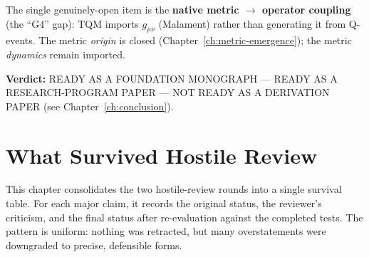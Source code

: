 \documentclass[10pt,twoside,openany]{book}
\begin{document}
The single genuinely-open item is the \textbf{native metric $\to$ operator coupling} (the
``G4'' gap): TQM imports $g_{\mu\nu}$ (Malament) rather than generating it from Q-events.
The metric \emph{origin} is closed (Chapter~\ref{ch:metric-emergence}); the metric
\emph{dynamics} remain imported.

\textbf{Verdict:} READY AS A FOUNDATION MONOGRAPH --- READY AS A RESEARCH-PROGRAM PAPER
--- NOT READY AS A DERIVATION PAPER (see Chapter~\ref{ch:conclusion}).


\chapter{What Survived Hostile Review}
\label{ch:survived}

This chapter consolidates the two hostile-review rounds into a single survival table. For
each major claim, it records the original status, the reviewer's criticism, and the final
status after re-evaluation against the completed tests. The pattern is uniform: nothing
was retracted, but many overstatements were downgraded to precise, defensible forms.
\end{document}

